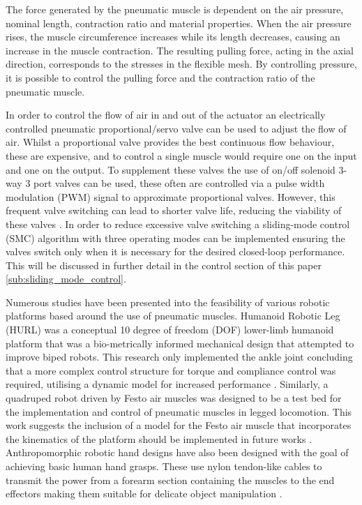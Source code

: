 \documentclass[11pt,a4paper]{article}
\begin{document}
The force generated by the pneumatic muscle is dependent on the air pressure, nominal length, contraction ratio and material properties. When the air pressure rises, the muscle circumference increases while its length decreases, causing an increase in the muscle contraction. The resulting pulling force, acting in the axial direction, corresponds to the stresses in the flexible mesh. By controlling pressure, it is possible to control the pulling force and the contraction ratio of the pneumatic muscle. \newline

In order to control the flow of air in and out of the actuator an electrically controlled pneumatic proportional/servo valve can be used to adjust the flow of air. Whilst a proportional valve provides the best continuous flow behaviour, these are expensive, and to control a single muscle would require one on the input and one on the output. To supplement these valves the use of on/off solenoid 3-way 3 port valves can be used, these often are controlled via a pulse width modulation (PWM) signal to approximate proportional valves. However, this frequent valve switching can lead to shorter valve life, reducing the viability of these valves \cite{zhang_bone_2018}. In order to reduce excessive valve switching a sliding-mode control (SMC) algorithm with three operating modes can be implemented ensuring the valves switch only when it is necessary for the desired closed-loop performance. This will be discussed in further detail in the control section of this paper \cref{sub:sliding_mode_control}. \newline

Numerous studies have been presented into the feasibility of various robotic platforms based around the use of pneumatic muscles. Humanoid Robotic Leg (HURL) was a conceptual 10 degree of freedom (DOF) lower-limb humanoid platform that was a bio-metrically informed mechanical design that attempted to improve biped robots. This research only implemented the ankle joint concluding that a more complex control structure for torque and compliance control was required, utilising a dynamic model for increased performance \cite{andrikopoulos_nikolakopoulos_2017}. Similarly, a quadruped robot driven by Festo air muscles was designed to be a test bed for the implementation and control of pneumatic muscles in legged locomotion. This work suggests the inclusion of a model for the Festo air muscle that incorporates the kinematics of the platform should be implemented in future works \cite{aschenbeck_kern_bachmann_quinn}. Anthropomorphic robotic hand designs have also been designed with the goal of achieving basic human hand grasps. These use nylon tendon-like cables to transmit the power from a forearm section containing the muscles to the end effectors making them suitable for delicate object manipulation \cite{lau_chai_2012}.
\end{document}
